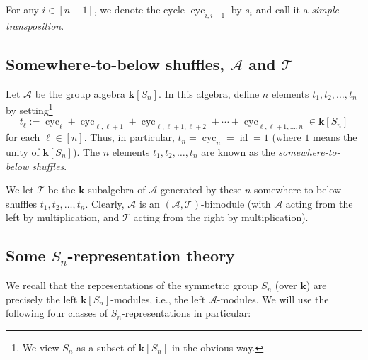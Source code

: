 \documentclass[numbers=enddot,12pt,final,onecolumn,notitlepage]{scrartcl}%
\theoremstyle{definition}
\begin{document}
For any $i\in\left[  n-1\right]  $, we denote the cycle $\operatorname*{cyc}%
\nolimits_{i,i+1}$ by $s_{i}$ and call it a \emph{simple transposition}.

\subsection{Somewhere-to-below shuffles, $\mathcal{A}$ and $\mathcal{T}$}

Let $\mathcal{A}$ be the group algebra $\mathbf{k}\left[  S_{n}\right]  $. In
this algebra, define $n$ elements $t_{1},t_{2},\ldots,t_{n}$ by
setting\footnote{We view $S_{n}$ as a subset of $\mathbf{k}\left[
S_{n}\right]  $ in the obvious way.}%
\[
t_{\ell}:=\operatorname*{cyc}\nolimits_{\ell}+\operatorname*{cyc}%
\nolimits_{\ell,\ell+1}+\operatorname*{cyc}\nolimits_{\ell,\ell+1,\ell
+2}+\cdots+\operatorname*{cyc}\nolimits_{\ell,\ell+1,\ldots,n}\in
\mathbf{k}\left[  S_{n}\right]
\]
for each $\ell\in\left[  n\right]  $. Thus, in particular, $t_{n}%
=\operatorname*{cyc}\nolimits_{n}=\operatorname*{id}=1$ (where $1$ means the
unity of $\mathbf{k}\left[  S_{n}\right]  $). The $n$ elements $t_{1}%
,t_{2},\ldots,t_{n}$ are known as the \emph{somewhere-to-below shuffles}.

We let $\mathcal{T}$ be the $\mathbf{k}$-subalgebra of $\mathcal{A}$ generated
by these $n$ somewhere-to-below shuffles $t_{1},t_{2},\ldots,t_{n}$. Clearly,
$\mathcal{A}$ is an $\left(  \mathcal{A},\mathcal{T}\right)  $-bimodule (with
$\mathcal{A}$ acting from the left by multiplication, and $\mathcal{T}$ acting
from the right by multiplication).

\subsection{Some $S_{n}$-representation theory}

We recall that the representations of the symmetric group $S_{n}$ (over
$\mathbf{k}$) are precisely the left $\mathbf{k}\left[  S_{n}\right]
$-modules, i.e., the left $\mathcal{A}$-modules. We will use the following
four classes of $S_{n}$-representations in particular:
\end{document}
